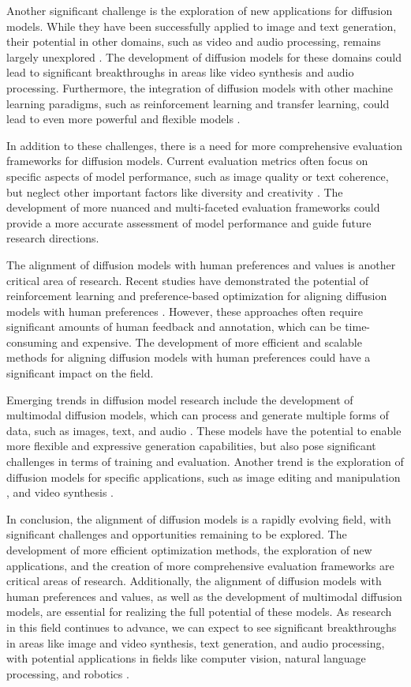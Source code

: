 \documentclass[11pt,a4paper]{article}
\begin{document}
Another significant challenge is the exploration of new applications for diffusion models. While they have been successfully applied to image and text generation, their potential in other domains, such as video and audio processing, remains largely unexplored \cite{doi:10.1145/3626235}. The development of diffusion models for these domains could lead to significant breakthroughs in areas like video synthesis and audio processing. Furthermore, the integration of diffusion models with other machine learning paradigms, such as reinforcement learning and transfer learning, could lead to even more powerful and flexible models \cite{arxiv:2502.10458}.

In addition to these challenges, there is a need for more comprehensive evaluation frameworks for diffusion models. Current evaluation metrics often focus on specific aspects of model performance, such as image quality or text coherence, but neglect other important factors like diversity and creativity \cite{arxiv:2508.09937}. The development of more nuanced and multi-faceted evaluation frameworks could provide a more accurate assessment of model performance and guide future research directions.

The alignment of diffusion models with human preferences and values is another critical area of research. Recent studies have demonstrated the potential of reinforcement learning and preference-based optimization for aligning diffusion models with human preferences \cite{arxiv:2404.04465}. However, these approaches often require significant amounts of human feedback and annotation, which can be time-consuming and expensive. The development of more efficient and scalable methods for aligning diffusion models with human preferences could have a significant impact on the field.

Emerging trends in diffusion model research include the development of multimodal diffusion models, which can process and generate multiple forms of data, such as images, text, and audio \cite{arxiv:2503.14504}. These models have the potential to enable more flexible and expressive generation capabilities, but also pose significant challenges in terms of training and evaluation. Another trend is the exploration of diffusion models for specific applications, such as image editing and manipulation \cite{arxiv:2601.14056}, and video synthesis \cite{doi:10.1109/cvpr52734.2025.00750}.

In conclusion, the alignment of diffusion models is a rapidly evolving field, with significant challenges and opportunities remaining to be explored. The development of more efficient optimization methods, the exploration of new applications, and the creation of more comprehensive evaluation frameworks are critical areas of research. Additionally, the alignment of diffusion models with human preferences and values, as well as the development of multimodal diffusion models, are essential for realizing the full potential of these models. As research in this field continues to advance, we can expect to see significant breakthroughs in areas like image and video synthesis, text generation, and audio processing, with potential applications in fields like computer vision, natural language processing, and robotics \cite{arxiv:2303.07576}.
\end{document}
